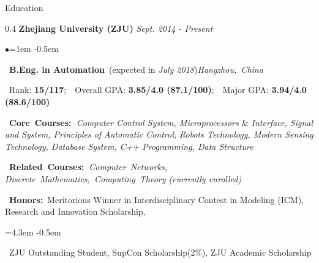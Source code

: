 \documentclass{resume} %
\begin{document}

\begin{rSection}{Education}

\begin{spacing}{0.4}
{\bf \Large{Zhejiang University (ZJU)}} \hfill {\em Sept. 2014 - Present}\smallskip\\
\end{spacing}
\begin{list}{$\bullet$}{\leftmargin=1em} %
   \itemsep -0.5em \vspace{-0.5em} %
\item ~{\bf B.Eng. in Automation}~(expected in {\em July 2018})\hfill{\em Hangzhou,~China}
\item ~{Rank:} {\bf15/117};~~{Overall GPA: }{\bf3.85/4.0 (87.1/100)};~~{Major GPA: }{\bf3.94/4.0 (88.6/100)}
\item ~{\bf Core~Courses:~}{\em Computer Control System, Microprocessors $\&$ Interface, Signal and System, Principles of Automatic Control, Robots Technology,  Modern Sensing Technology, Database System, C++ Programming, Data Structure}
\item ~{\bf Related~Courses:~}{\em Computer~Networks, Discrete~Mathematics,~Computing~Theory (currently enrolled)}
\item ~{\bfseries Honors:}~{Meritorious Winner in Interdisciplinary Contest in Modeling (ICM), Research and Innovation Scholarship,}
	\begin{list}{}{\leftmargin=4.3em}
	\itemsep -0.5em \vspace{-0.5em}
	\item ~{ZJU Outstanding Student, SupCon Scholarship(2$\%$), ZJU Academic Scholarship}
	\end{list}
	\end{list}


\end{rSection}
\end{document}

